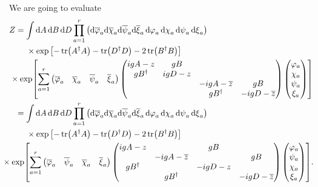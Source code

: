 \documentclass{article}
\begin{document}
We are going to evaluate
\begin{align*}
    Z &= \int \dd{A} \dd{B} \dd{D} \prod_{a=1}^r \qty(\dd\overline{\varphi}_a \dd\overline{\chi}_a \dd\overline{\psi}_a \dd\overline{\xi}_a \dd{\varphi}_a \dd{\chi}_a \dd{\psi}_a \dd{\xi}_a) \\
    &{\phantom{{}={}}} \times \exp\qty[-\tr({A^\dagger A}) - \tr({D^\dagger D}) - 2\tr({B^\dagger B})] \\
    &{\phantom{{}={}}} \hspace{-2em} \times \exp[\sum_{a=1}^r \begin{pmatrix}
        \overline{\varphi}_a & \overline{\chi}_a & \overline{\psi}_a & \overline{\xi}_a
    \end{pmatrix} \begin{pmatrix}
        igA - z & gB & & \\
        gB^\dagger & igD - z & & \\
        & & -igA - \overline{z} & gB \\
        & & gB^\dagger & -igD - \overline{z}
    \end{pmatrix} \begin{pmatrix}
        \varphi_a \\ \chi_a \\ \psi_a \\ \xi_a
    \end{pmatrix}] \\
    &= \int \dd{A} \dd{B} \dd{D} \prod_{a=1}^r \qty(\dd\overline{\varphi}_a \dd\overline{\chi}_a \dd\overline{\psi}_a \dd\overline{\xi}_a \dd{\varphi}_a \dd{\chi}_a \dd{\psi}_a \dd{\xi}_a) \\
    &{\phantom{{}={}}} \times \exp\qty[-\tr({A^\dagger A}) - \tr({D^\dagger D}) - 2\tr({B^\dagger B})] \\
    &{\phantom{{}={}}} \hspace{-3em} \times \exp[\sum_{a=1}^r \begin{pmatrix}
        \overline{\varphi}_a  & \overline{\psi}_a & \overline{\chi}_a & \overline{\xi}_a
    \end{pmatrix} \begin{pmatrix}
        igA - z & & gB & \\
        & -igA - \overline{z} & & gB \\
        gB^\dagger & & -igD - z & \\
        & gB^\dagger & & -igD - \overline{z}
    \end{pmatrix} \begin{pmatrix}
        \varphi_a \\ \psi_a \\ \chi_a \\ \xi_a
    \end{pmatrix}].
\end{align*}
\end{document}
